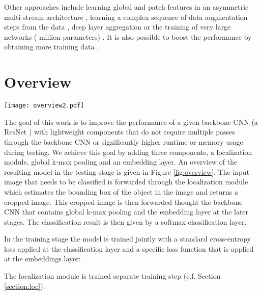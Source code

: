 \documentclass[10pt,twocolumn,letterpaper]{article}
\begin{document}
Other approaches include learning global and patch features in an asymmetric multi-stream architecture \cite{wang2018learning}, learning a complex sequence of data augmentation steps from the data \cite{cubuk2018autoaugment}, deep layer aggregation \cite{yu2018deep} or the training of very large networks ( million parameters) \cite{huang2018gpipe}. It is also possible to boost the performance by obtaining more training data \cite{cui2018large,krause2016unreasonable}.


\section{Overview}
\begin{figure*}[t]
\begin{center}
   \texttt{[image: overview2.pdf]}
\end{center}
   \caption{Overview of the proposed model including a lightweight localization module, global k-max pooling and an embedding layer.}
\label{fig:overview}
\end{figure*}

The goal of this work is to improve the performance of a given backbone CNN (\eg a ResNet \cite{he2016deep}) with lightweight components that do not require multiple passes through the backbone CNN or significantly higher runtime or memory usage during testing. We achieve this goal by adding three components, a localization module, global k-max pooling and an embedding layer. An overview of the resulting model in the testing stage is given in Figure \ref{fig:overview}. The input image that needs to be classified is forwarded through the localization module which estimates the bounding box of the object in the image and returns a cropped image. This cropped image is then forwarded thought the backbone CNN that contains global k-max pooling and the embedding layer at the later stages. The classification result is then given by a softmax classification layer.

In the training stage the model is trained jointly with a standard cross-entropy loss  applied at the classification layer and a specific loss function  that is applied at the embeddings layer:



The localization module is trained separate training step (c.f. Section \ref{section:loc}).
\end{document}
